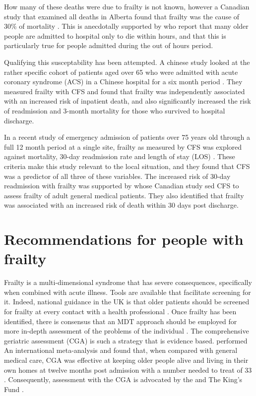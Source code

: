 \documentclass
[
	12pt,
	a4paper,
	oneside,
]{report}
\begin{document}
How many of these deaths were due to frailty is not known, however 
a Canadian study that examined all deaths in Alberta found that frailty was the
cause of 30\% of mortality \parencite{fassbender:09}. This is anecdotally
supported by \textcite{silver:12} who report that many older people are admitted 
to hospital only to die within hours, and that
this is particularly true for people admitted during the out of hours period.

Qualifying this susceptability
has been attempted. 
A chinese study looked at the rather specific cohort of patients aged over 65
who were admitted with acute coronary syndrome (ACS) in a Chinese hospital for 
a six month period \parencite{kang:15}. They measured frailty with CFS and 
found that frailty was independently associated with an increased risk of 
inpatient death, and also significantly increased the risk of readmission and 
3-month mortality for those who survived to hospital discharge.

In a recent study of emergency admission of patients over 
75 years old through a full 12 month period at a single site, frailty as
measured by CFS was explored against mortality, 30-day readmission rate and 
length of stay (LOS)
\parencite{wallis:15}.
These criteria make this study relevant to the local situation, and they found 
that CFS was a predictor of all three of these variables. The increased risk of
30-day readmission with frailty was supported by \textcite{kahlon:15} whose 
Canadian study sed CFS to assess frailty of adult general medical patients. 
They also identified that frailty was associated with an increased risk of death
within 30 days post discharge.

\section{Recommendations for people with frailty}

Frailty is a multi-dimensional syndrome that has severe consequences,
specifically when combined with acute illness. Tools are available that facilitate
screening for it. Indeed, national guidance in the UK is that older patients 
should be screened for frailty at every contact with a health professional 
\parencite{bgs:14}. Once frailty has been identified, there is consensus that
an MDT approach should be employed for more in-depth assessment of the 
problems of the individual \parencite{vellas:16}. The comprehensive geriatric
assessment (CGA) is such a strategy that is evidence based. \textcite{ellis:11}
performed An international 
meta-analysis and found that, when compared with general medical care,
CGA was effective at keeping older people alive and living in their own homes at
twelve months post admission with a number needed to treat of 33 \parencite{ellis:11}.
Consequently, assessment with the CGA is advocated by the \textcite{bgs:14}
and The King's Fund \parencite{oliver:14}.
\end{document}
